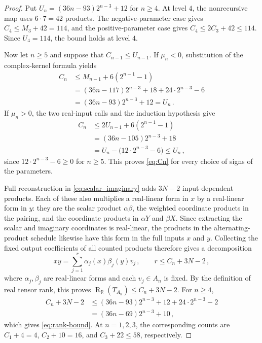 \documentclass[11pt,reqno]{amsart}
\numberwithin{equation}{section}
\newcommand{\R}{\mathbb R}
\newcommand{\Rk}{\operatorname{R}}
\begin{document}
\begin{proof}
Put $U_n=(36n-93)2^{n-3}+12$ for $n\ge4$. At level $4$, the nonrecursive map
uses $6\cdot7=42$ products. The negative-parameter case gives
$C_4\le M_3+42=114$, and the positive-parameter case gives
$C_4\le2C_3+42\le114$. Since $U_4=114$, the bound holds at level $4$.

Now let $n\ge5$ and suppose that $C_{n-1}\le U_{n-1}$. If $\mu_n<0$,
substitution of the complex-kernel formula yields
\[
\begin{aligned}
C_n&\le M_{n-1}+6(2^{n-1}-1)\\
&=(36n-117)2^{n-3}+18+24\cdot2^{n-3}-6\\
&=(36n-93)2^{n-3}+12=U_n\,.
\end{aligned}
\]
If $\mu_n>0$, the two real-input calls and the induction hypothesis give
\[
\begin{aligned}
C_n&\le2U_{n-1}+6(2^{n-1}-1)\\
&=(36n-105)2^{n-3}+18\\
&=U_n-\bigl(12\cdot2^{n-3}-6\bigr)\le U_n\,,
\end{aligned}
\]
since $12\cdot2^{n-3}-6\ge0$ for $n\ge5$. This proves
\eqref{eq:Cn} for every choice of signs of the parameters.

Full reconstruction in \eqref{eq:scalar--imaginary} adds $3N-2$
input-dependent products. Each of these also multiplies a real-linear
form in $x$ by a real-linear form in $y$: they are the scalar product
$\alpha\beta$, the weighted coordinate products in the pairing, and the
coordinate products in $\alpha Y$ and $\beta X$. Since extracting the
scalar and imaginary coordinates is real-linear, the products in the
alternating-product schedule likewise have this form in the full inputs
$x$ and $y$. Collecting the fixed output coefficients of all counted
products therefore gives a decomposition
\[
xy=\sum_{j=1}^r\alpha_j(x)\beta_j(y)v_j\,,\qquad
r\le C_n+3N-2\,,
\]
where $\alpha_j,\beta_j$ are real-linear forms and each $v_j\in A_n$
is fixed. By the definition of real tensor rank, this proves
$\Rk_{\R}(T_{A_n})\le C_n+3N-2$. For $n\ge4$,
\[
\begin{aligned}
C_n+3N-2
&\le(36n-93)2^{n-3}+12+24\cdot2^{n-3}-2\\
&=(36n-69)2^{n-3}+10\,,
\end{aligned}
\]
which gives \eqref{eq:rank-bound}. At $n=1,2,3$, the corresponding
counts are $C_1+4=4$, $C_2+10=16$, and $C_3+22\le58$, respectively.
\end{proof}
\end{document}
